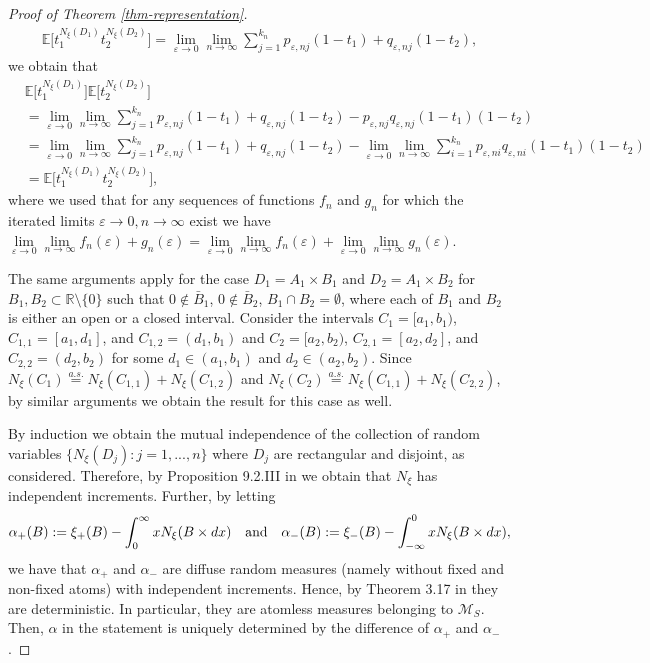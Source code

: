 \documentclass{article}
\theoremstyle{plain}
\theoremstyle{remark}
\begin{document}
\begin{proof}[Proof of Theorem \ref{thm-representation}]
	\begin{align*}
		\mathbb{E}\big[t_1^{N_\xi(D_1)}t_2^{N_\xi(D_2)}\big]=\lim\limits_{\varepsilon\to 0}\lim\limits_{n\to\infty}\sum_{j=1}^{k_n}p_{\varepsilon,nj}(1-t_1)+q_{\varepsilon,nj}(1-t_2),
	\end{align*}
	we obtain that 
	\begin{align*}
		&\mathbb{E}\big[t_1^{N_\xi(D_1)}\big]\mathbb{E}\big[t_2^{N_\xi(D_2)}\big]\\&	=\lim\limits_{\varepsilon\to 0}\lim\limits_{n\to\infty}\sum_{j=1}^{k_n}p_{\varepsilon,nj}(1-t_1)+q_{\varepsilon,nj}(1-t_2)-p_{\varepsilon,nj}q_{\varepsilon,nj}(1-t_1)(1-t_2)\\&=\lim\limits_{\varepsilon\to 0}\lim\limits_{n\to\infty}\sum_{j=1}^{k_n}p_{\varepsilon,nj}(1-t_1)+q_{\varepsilon,nj}(1-t_2)-\lim\limits_{\varepsilon\to 0}\lim\limits_{n\to\infty}\sum_{i=1}^{k_n}p_{\varepsilon,ni}q_{\varepsilon,ni}(1-t_1)(1-t_2)\\&			=	\mathbb{E}\big[t_1^{N_\xi(D_1)}t_2^{N_\xi(D_2)}\big],
	\end{align*}
	where we used that for any sequences of functions $f_n$ and $g_n$ for which the iterated limits $\varepsilon\to 0,n\to\infty$ exist we have $\lim\limits_{\varepsilon\to 0}\lim\limits_{n\to\infty}f_n(\varepsilon)+g_n(\varepsilon)=\lim\limits_{\varepsilon\to 0}\lim\limits_{n\to\infty}f_n(\varepsilon)+\lim\limits_{\varepsilon\to 0}\lim\limits_{n\to\infty}g_n(\varepsilon)$.
	
	The same arguments apply for the case $D_1=A_1\times B_1$ and $D_2=A_1\times B_2$ for $B_1,B_2\subset\mathbb{R}\setminus\{0\}$ such that $0\notin \bar{B}_1$, $0\notin \bar{B}_2$, $B_1\cap B_2=\emptyset$, where each of $B_1$ and $B_2$ is either an open or a closed interval. Consider the intervals $C_1=[a_1,b_1)$, $C_{1,1}=[a_1,d_1]$, and $C_{1,2}=(d_1,b_1)$ and $C_2=[a_2,b_2)$, $C_{2,1}=[a_2,d_2]$, and $C_{2,2}=(d_2,b_2)$ for some $d_1\in (a_1,b_1)$ and $d_2\in (a_2,b_2)$. Since $N_\xi(C_1)\stackrel{a.s.}{=}N_\xi(C_{1,1})+N_\xi(C_{1,2})$ and $N_\xi(C_2)\stackrel{a.s.}{=}N_\xi(C_{1,1})+N_\xi(C_{2,2})$, by similar arguments we obtain the result for this case as well. 
	
	By induction we obtain the mutual independence of the collection of random variables $\{N_\xi(D_j):j=1,...,n \}$ where $D_j$ are rectangular and disjoint, as considered. Therefore, by Proposition 9.2.III in \cite{Daley} we obtain that $N_\xi$ has independent increments. Further, by letting 
	\begin{equation*}
		\alpha_+(B):=\xi_+(B)-\int_{0}^{\infty}x N_{\xi}(B\times dx)\quad\textnormal{and}\quad\alpha_-(B):=\xi_-(B)-\int_{-\infty}^{0}x N_{\xi}(B\times dx),
	\end{equation*}
	we have that $\alpha_+$ and $\alpha_-$ are diffuse random measures (namely without fixed and non-fixed atoms) with independent increments. Hence, by Theorem 3.17 in \cite{Kallenberg2} they are deterministic. In particular, they are atomless measures belonging to $\mathcal{M}_S$. Then, $\alpha$ in the statement is uniquely determined by the difference of $\alpha_+$ and $\alpha_-$.
	

\end{proof}
\end{document}

